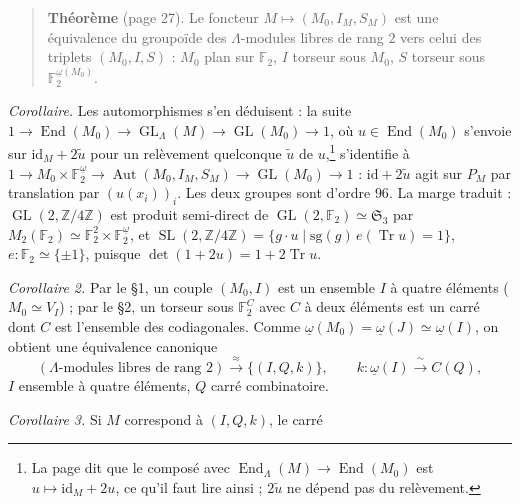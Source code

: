 \documentclass[11pt,a4paper]{article}
\begin{document}
\begin{quote}
\textbf{Théorème} (page 27). Le foncteur $M \mapsto (M_0, I_M, S_M)$ est une
équivalence du groupoïde des $\Lambda$-modules libres de rang $2$ vers celui
des triplets $(M_0, I, S)$ : $M_0$ plan sur $\mathbb{F}_2$, $I$ torseur sous
$M_0$, $S$ torseur sous $\mathbb{F}_2^{\underline{\omega}(M_0)}$.
\end{quote}

\emph{Corollaire.} Les automorphismes s'en déduisent : la suite
$1 \to \operatorname{End}(M_0) \to \operatorname{GL}_\Lambda(M) \to
\operatorname{GL}(M_0) \to 1$, où $u \in \operatorname{End}(M_0)$ s'envoie sur
$\mathrm{id}_M + 2\tilde u$ pour un relèvement quelconque $\tilde u$ de
$u$,\footnote{La page dit que le composé avec
$\operatorname{End}_\Lambda(M) \to \operatorname{End}(M_0)$ est
$u \mapsto \mathrm{id}_M + 2u$, ce qu'il faut lire ainsi ; $2\tilde u$ ne
dépend pas du relèvement.} s'identifie à $1 \to M_0 \times
\mathbb{F}_2^{\underline{\omega}} \to \operatorname{Aut}(M_0, I_M, S_M) \to
\operatorname{GL}(M_0) \to 1$ : $\mathrm{id} + 2\tilde u$ agit sur $P_M$ par
translation par $(u(x_i))_i$. Les deux groupes sont d'ordre $96$. La marge
traduit : $\operatorname{GL}(2, \mathbb{Z}/4\mathbb{Z})$ est produit semi-direct
de $\operatorname{GL}(2, \mathbb{F}_2) \simeq \mathfrak{S}_3$ par
$M_2(\mathbb{F}_2) \simeq \mathbb{F}_2^2 \times
\mathbb{F}_2^{\underline{\omega}}$, et
$\operatorname{SL}(2, \mathbb{Z}/4\mathbb{Z}) = \{ g \cdot u \mid
\mathrm{sg}(g)\, e(\operatorname{Tr} u) = 1 \}$, $e : \mathbb{F}_2 \simeq
\{\pm 1\}$, puisque $\det(1 + 2u) = 1 + 2 \operatorname{Tr} u$.

\emph{Corollaire 2.} Par le §1, un couple $(M_0, I)$ est un ensemble $I$ à
quatre éléments ($M_0 \simeq V_I$) ; par le §2, un torseur sous $\mathbb{F}_2^C$
avec $C$ à deux éléments est un carré dont $C$ est l'ensemble des codiagonales.
Comme $\underline{\omega}(M_0) = \underline{\omega}(J) \simeq
\underline{\omega}(I)$, on obtient une équivalence canonique
\[
(\Lambda\text{-modules libres de rang } 2) \xrightarrow{\;\approx\;}
\{(I, Q, k)\}, \qquad k : \underline{\omega}(I) \xrightarrow{\;\sim\;} C(Q),
\]
$I$ ensemble à quatre éléments, $Q$ carré combinatoire.

\emph{Corollaire 3.} Si $M$ correspond à $(I, Q, k)$, le carré

\end{document}
